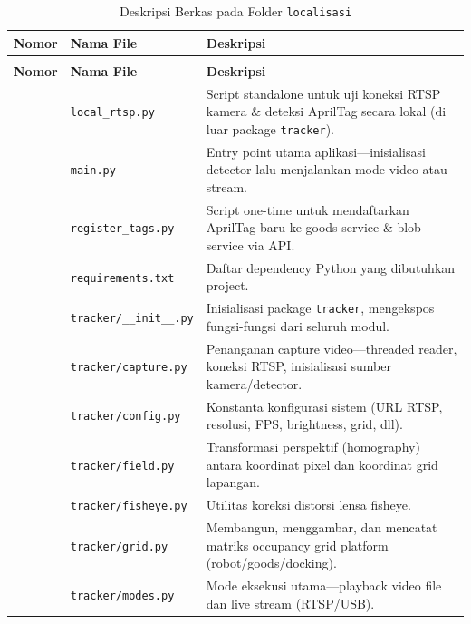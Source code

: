 \begin{xltabular}{\textwidth}{ | >{\raggedright\arraybackslash}p{1.5cm} | >{\raggedright\arraybackslash}p{4cm} | >{\raggedright\arraybackslash}X | }
    \caption{Deskripsi Berkas pada Folder \texttt{localisasi}} \label{tab:file-lokalisasi} \\
    \hline
    \textbf{Nomor} & \textbf{Nama File} & \textbf{Deskripsi} \\
    \hline
    \endfirsthead
     \\
    \hline
    \textbf{Nomor} & \textbf{Nama File} & \textbf{Deskripsi} \\
    \hline
    \endhead
    \hline
     & \texttt{local\_rtsp.py} & Script standalone untuk uji koneksi RTSP kamera \& deteksi AprilTag secara lokal (di luar package \texttt{tracker}). \\
     & \texttt{main.py} & Entry point utama aplikasi---inisialisasi detector lalu menjalankan mode video atau stream. \\
     & \texttt{register\_tags.py} & Script one-time untuk mendaftarkan AprilTag baru ke goods-service \& blob-service via API. \\
     & \texttt{requirements.txt} & Daftar dependency Python yang dibutuhkan project. \\
     & \texttt{tracker/\allowbreak \_\_init\_\_.py} & Inisialisasi package \texttt{tracker}, mengekspos fungsi-fungsi dari seluruh modul. \\
     & \texttt{tracker/\allowbreak capture.py} & Penanganan capture video---threaded reader, koneksi RTSP, inisialisasi sumber kamera/detector. \\
     & \texttt{tracker/\allowbreak config.py} & Konstanta konfigurasi sistem (URL RTSP, resolusi, FPS, brightness, grid, dll). \\
     & \texttt{tracker/\allowbreak field.py} & Transformasi perspektif (homography) antara koordinat pixel dan koordinat grid lapangan. \\
     & \texttt{tracker/\allowbreak fisheye.py} & Utilitas koreksi distorsi lensa fisheye. \\
     & \texttt{tracker/\allowbreak grid.py} & Membangun, menggambar, dan mencatat matriks occupancy grid platform (robot/goods/docking). \\
     & \texttt{tracker/\allowbreak modes.py} & Mode eksekusi utama---playback video file dan live stream (RTSP/USB). \\

\end{xltabular}
